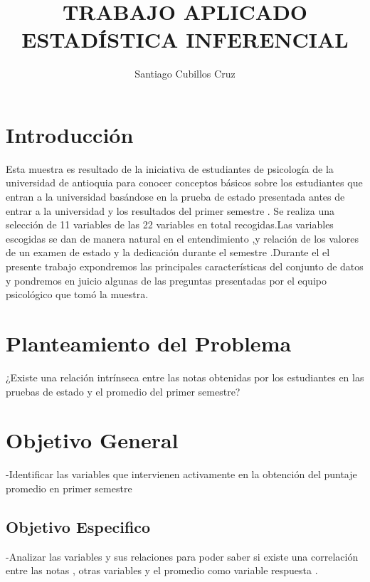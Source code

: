\documentclass[
  man]{apa6}
\title{TRABAJO APLICADO ESTADÍSTICA INFERENCIAL}
\author{Santiago Cubillos Cruz\textsuperscript{}}
\date{}
\affiliation{\phantom{0}}
\begin{document}
\maketitle

\hypertarget{introducciuxf3n}{%
\section{Introducción}\label{introducciuxf3n}}

Esta muestra es resultado de la iniciativa de estudiantes de psicología
de la universidad de antioquia para conocer conceptos básicos sobre los
estudiantes que entran a la universidad basándose en la prueba de estado
presentada antes de entrar a la universidad y los resultados del primer
semestre . Se realiza una selección de 11 variables de las 22 variables
en total recogidas.Las variables escogidas se dan de manera natural en
el entendimiento ,y relación de los valores de un examen de estado y la
dedicación durante el semestre .Durante el el presente trabajo
expondremos las principales características del conjunto de datos y
pondremos en juicio algunas de las preguntas presentadas por el equipo
psicológico que tomó la muestra.

\hypertarget{planteamiento-del-problema}{%
\section{Planteamiento del Problema}\label{planteamiento-del-problema}}

¿Existe una relación intrínseca entre las notas obtenidas por los
estudiantes en las pruebas de estado y el promedio del primer semestre?

\hypertarget{objetivo-general}{%
\section{Objetivo General}\label{objetivo-general}}

-Identificar las variables que intervienen activamente en la obtención
del puntaje promedio en primer semestre

\hypertarget{objetivo-especifico}{%
\subsection{Objetivo Especifico}\label{objetivo-especifico}}

-Analizar las variables y sus relaciones para poder saber si existe una
correlación entre las notas , otras variables y el promedio como
variable respuesta . \newpage
\end{document}
